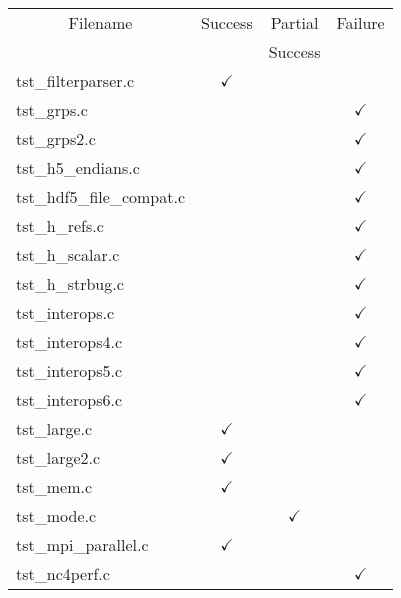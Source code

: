 \begin{table}[H]
\centering
\begin{tabular}{|l|c|c|c|}
\hline
\multicolumn{1}{|c|}{\parbox{8cm}{\centering Filename}} & \multicolumn{1}{c|}{Success} & \multicolumn{1}{c|}{Partial} & \multicolumn{1}{c|}{Failure} \\
                        &               & Success       &               \\ \hline \hline
tst\_filterparser.c     & $\checkmark$  &               &               \\ \hline
tst\_grps.c             &               &               & $\checkmark$  \\ \hline
tst\_grps2.c            &               &               & $\checkmark$  \\ \hline
tst\_h5\_endians.c      &               &               & $\checkmark$  \\ \hline
tst\_hdf5\_file\_compat.c   &           &               & $\checkmark$  \\ \hline
tst\_h\_refs.c          &               &               & $\checkmark$  \\ \hline
tst\_h\_scalar.c        &               &               & $\checkmark$  \\ \hline
tst\_h\_strbug.c        &               &               & $\checkmark$  \\ \hline
tst\_interops.c         &               &               & $\checkmark$  \\ \hline
tst\_interops4.c        &               &               & $\checkmark$  \\ \hline
tst\_interops5.c        &               &               & $\checkmark$  \\ \hline
tst\_interops6.c        &               &               & $\checkmark$  \\ \hline
tst\_large.c            & $\checkmark$  &               &               \\ \hline
tst\_large2.c           & $\checkmark$  &               &               \\ \hline
tst\_mem.c              & $\checkmark$  &               &               \\ \hline
tst\_mode.c             &               & $\checkmark$  &               \\ \hline
tst\_mpi\_parallel.c    & $\checkmark$  &               &               \\ \hline
tst\_nc4perf.c          &               &               & $\checkmark$  \\ \hline

\end{tabular}
\end{table}
